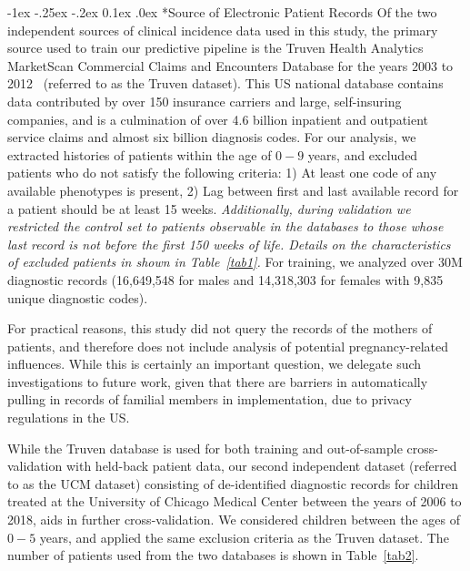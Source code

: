 \documentclass[onecolumn,,10pt]{IEEEtran}
\makeatletter
\renewcommand\subsection{\@startsection {section}{1}{\z@}%
  {-1ex \@plus -.25ex \@minus -.2ex}%
  {0.1ex \@plus.0ex}%
  {\fontsize{11}{12}\selectfont\bfseries\sffamily\color{DodgerBlue4}}}
\newcommand{\hil}[1]{{\color{Red1}\itshape #1}}
\makeatother
\begin{document}
\else
{}\label{figprc}
\fi


\subsection*{Source of Electronic Patient Records}
Of the two independent sources of clinical incidence data used in this study,  the primary source used to train our predictive pipeline  is the Truven Health Analytics  MarketScan\textsuperscript{\textregistered} Commercial Claims and Encounters Database for the years 2003 to 2012~\cite{hansen2017truven} (referred to  as the Truven dataset). 
 This US national database contains data contributed by over 150 insurance carriers and large, self-insuring companies, and is a culmination of over  4.6 billion inpatient and outpatient service claims and  almost six billion diagnosis codes.  For our analysis, we extracted histories of patients within the age of $0-9$ years, and excluded  patients who do not satisfy the following criteria: 1) At least one code of any available phenotypes is present, 2) Lag between first and last available record for a patient should be at least 15 weeks. \hil{Additionally, during validation we restricted the control set to patients observable in the databases to those whose last record is not before the first 150 weeks of life. Details on the characteristics of excluded patients in shown in Table~\ref{tab1}.}
For training, we analyzed over 30M diagnostic records (16,649,548 for males and  14,318,303  for females with 9,835 unique diagnostic codes).

For practical reasons, this study did not query the records of the mothers of patients, and therefore does not include analysis of potential pregnancy-related influences. 
While this is certainly an important question, we delegate such investigations to future work, given that there are barriers in automatically  pulling in records of familial members in implementation, due to privacy regulations in the US.  
%

While the Truven database is used for both training and out-of-sample cross-validation with held-back patient data, our second independent dataset (referred to as the UCM dataset) consisting of de-identified diagnostic records for children treated at the University of Chicago Medical Center between the years of 2006 to 2018, aids in further cross-validation. We considered children between the ages of $0-5$ years, and  applied the same exclusion criteria as the Truven dataset.
The  number of  patients used from the two databases is shown in Table~\ref{tab2}.
\end{document}

